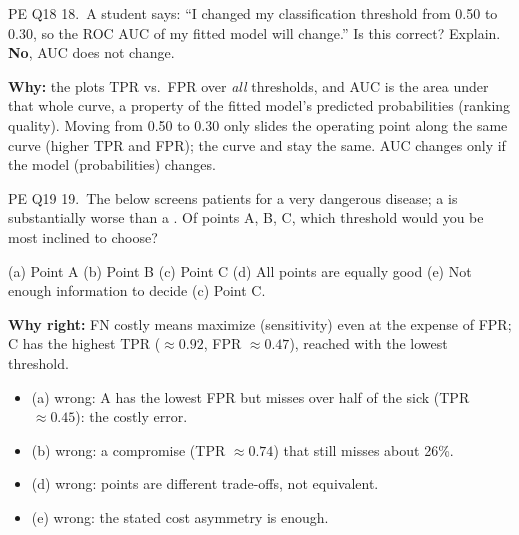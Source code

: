 \begin{qbox}{PE Q18}
18.~A student says: ``I changed my classification threshold from 0.50 to 0.30, so the ROC AUC of my fitted model will change.'' Is this correct? Explain.
\ans \textbf{No}, AUC does not change.\par
\textbf{Why:} the  plots TPR vs.\ FPR over \emph{all} thresholds, and AUC is the area under that whole curve, a property of the fitted model's predicted probabilities (ranking quality). Moving from 0.50 to 0.30 only slides the operating point along the same curve (higher TPR and FPR); the curve and  stay the same. AUC changes only if the model (probabilities) changes. 
\end{qbox}

\begin{qbox}{PE Q19}
19.~The  below screens patients for a very dangerous disease; a  is substantially worse than a . Of points A, B, C, which threshold would you be most inclined to choose?\par
{} 
(a) Point A \quad (b) Point B \quad (c) Point C \quad (d) All points are equally good \quad (e) Not enough information to decide
\ans (c) Point C.\par
\textbf{Why right:} FN costly means maximize  (sensitivity) even at the expense of FPR; C has the highest TPR ($\approx0.92$, FPR $\approx0.47$), reached with the lowest threshold.
\begin{itemize}[leftmargin=1em,itemsep=0pt]
\item (a) wrong: A has the lowest FPR but misses over half of the sick (TPR $\approx0.45$): the costly error.
\item (b) wrong: a compromise (TPR $\approx0.74$) that still misses about 26\%.
\item (d) wrong: points are different trade-offs, not equivalent.
\item (e) wrong: the stated cost asymmetry is enough.
\end{itemize}
\end{qbox}

